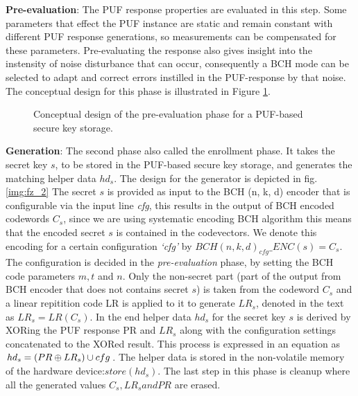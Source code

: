 \textbf{Pre-evaluation}: The PUF response properties are evaluated in this step. Some parameters that effect the PUF instance are static and remain constant with different PUF response generations, so measurements can be compensated for these parameters. Pre-evaluating the response also gives insight into the instensity of noise disturbance that can occur, consequently a BCH mode can be selected to adapt and correct errors instilled in the PUF-response by that noise. The conceptual
design for this phase is illustrated in Figure \ref{img:fz_1}.\\

\begin{figure}
\centering
{}
\caption{Conceptual design of the pre-evaluation phase for a PUF-based secure key storage.}
\label{img:fz_1}
\end{figure}

\textbf{Generation}: The second phase also called the enrollment phase. It takes the secret key $s$, to be stored in the PUF-based secure key storage, and generates the matching helper data $hd_s$. The design for the generator is depicted in fig. \ref{img:fz_2}  The secret $s$ is provided as input to the BCH (n, k, d) encoder that is configurable via the input line \emph{cfg}, this results in the output of BCH encoded codewords $C_s$, since we are using systematic encoding BCH algorithm this means that
the encoded secret $s$ is contained in the codevectors. We denote this encoding for a certain configuration \emph{`cfg'} by $BCH(n,k,d)_{cfg}\_ENC(s) = C_s$. The configuration is decided in the \emph{pre-evaluation} phase, by setting the BCH code parameters $m, t$ and $n$.
Only the non-secret part (part of the output from BCH encoder that does not contains secret $s$) is taken from the codeword $C_s$ and a linear repitition code LR is applied to it to generate $LR_s$, denoted in the text as $LR_s = LR(C_s)$. In the end helper data $hd_s$ for the secret key $s$ is derived by XORing the PUF response PR and $LR_s$ along with the configuration settings concatenated to the XORed result. This process is expressed in an equation as $hd_s = (PR \mathbin{\oplus} LR_s) \cup cfg$.
The helper data is stored in the non-volatile memory of the hardware device:$store(hd_s)$. The last step in this phase is cleanup where all the generated values $C_s, LR_s and PR$ are erased.\\

